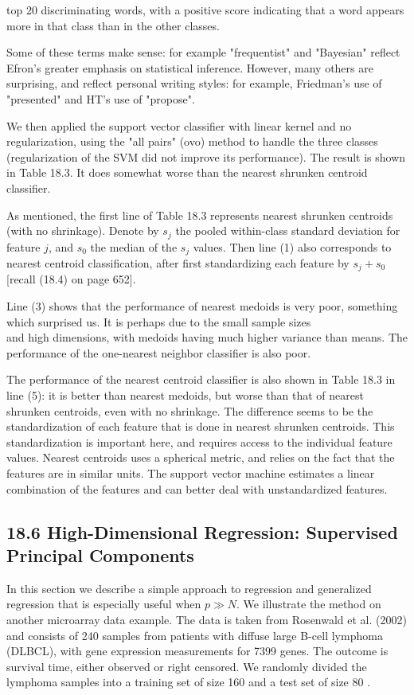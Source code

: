 \documentclass[10pt]{article}
\begin{document}
top 20 discriminating words, with a positive score indicating that a word appears more in that class than in the other classes.

Some of these terms make sense: for example "frequentist" and "Bayesian" reflect Efron's greater emphasis on statistical inference. However, many others are surprising, and reflect personal writing styles: for example, Friedman's use of "presented" and HT's use of "propose".

We then applied the support vector classifier with linear kernel and no regularization, using the "all pairs" (ovo) method to handle the three classes (regularization of the SVM did not improve its performance). The result is shown in Table 18.3. It does somewhat worse than the nearest shrunken centroid classifier.

As mentioned, the first line of Table 18.3 represents nearest shrunken centroids (with no shrinkage). Denote by $s_{j}$ the pooled within-class standard deviation for feature $j$, and $s_{0}$ the median of the $s_{j}$ values. Then line (1) also corresponds to nearest centroid classification, after first standardizing each feature by $s_{j}+s_{0}$ [recall (18.4) on page 652].

Line (3) shows that the performance of nearest medoids is very poor, something which surprised us. It is perhaps due to the small sample sizes\\
and high dimensions, with medoids having much higher variance than means. The performance of the one-nearest neighbor classifier is also poor.

The performance of the nearest centroid classifier is also shown in Table 18.3 in line (5): it is better than nearest medoids, but worse than that of nearest shrunken centroids, even with no shrinkage. The difference seems to be the standardization of each feature that is done in nearest shrunken centroids. This standardization is important here, and requires access to the individual feature values. Nearest centroids uses a spherical metric, and relies on the fact that the features are in similar units. The support vector machine estimates a linear combination of the features and can better deal with unstandardized features.

\subsection*{18.6 High-Dimensional Regression: Supervised Principal Components}
In this section we describe a simple approach to regression and generalized regression that is especially useful when $p \gg N$. We illustrate the method on another microarray data example. The data is taken from Rosenwald et al. (2002) and consists of 240 samples from patients with diffuse large B-cell lymphoma (DLBCL), with gene expression measurements for 7399 genes. The outcome is survival time, either observed or right censored. We randomly divided the lymphoma samples into a training set of size 160 and a test set of size 80 .
\end{document}
